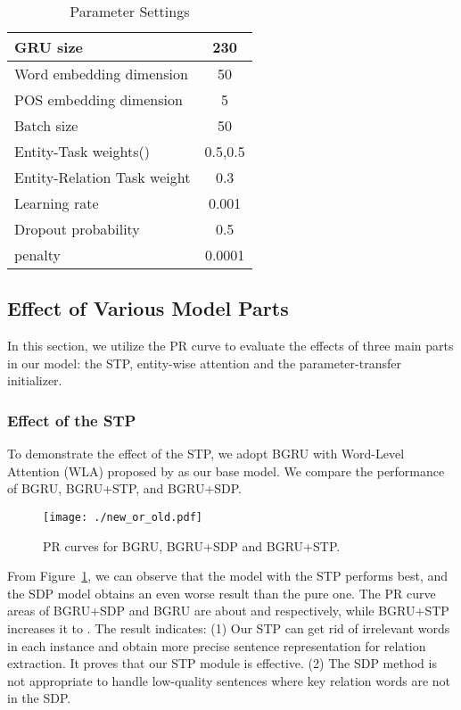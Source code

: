 \documentclass[11pt,a4paper]{article}
\begin{document}
  \begin{table}[htbp]
    \centering
    \begin{tabular}{|l|c|}
      \hline
      GRU size  & 230\\
      \hline
      Word embedding dimension  & 50\\
      \hline
      POS embedding dimension  & 5\\
      \hline
      Batch size  & 50\\
      \hline
      Entity-Task weights() & 0.5,0.5\\
      \hline
      Entity-Relation Task weight  & 0.3\\
      \hline
      Learning rate  & 0.001\\
      \hline
      Dropout probability  & 0.5\\
      \hline
       penalty  & 0.0001\\
      \hline
    \end{tabular}
    \caption{Parameter Settings}
    \label{table:parameter}
  \end{table}

  \subsection{Effect of Various Model Parts}
  In this section, we utilize the PR curve to evaluate the effects of three main parts in our model: the STP, entity-wise attention and the parameter-transfer initializer.

  \subsubsection*{Effect of the STP}
  To demonstrate the effect of the STP, we adopt BGRU with Word-Level Attention (WLA) proposed by \citet{zhou2016attention} as our base model. We compare the performance of BGRU, BGRU+STP, and BGRU+SDP.

  \begin{figure}[htbp]
    \centering
    \texttt{[image: ./new\_or\_old.pdf]}
    \caption{PR curves for BGRU, BGRU+SDP and BGRU+STP.}
    \label{fig:new_or_old}
  \end{figure}

  From Figure~\ref{fig:new_or_old}, we can observe that the model with the STP performs best, and the SDP model obtains an even worse result than the pure one. The PR curve areas of BGRU+SDP and BGRU are about  and  respectively, while BGRU+STP increases it to . The result indicates: (1) Our STP can get rid of irrelevant words in each instance and obtain more precise sentence representation for relation extraction. It proves that our STP module is effective. (2) The SDP method is not appropriate to handle low-quality sentences where key relation words are not in the SDP.
\end{document}
